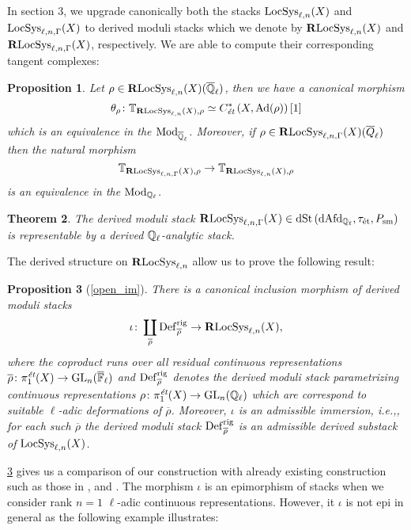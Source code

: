 \documentclass[10pt,a4paper]{amsart}
\numberwithin{equation}{subsection}
\theoremstyle{plain}
\newtheorem{theorem}{Theorem}[section]
\newtheorem{prop}[theorem]{Proposition}
\theoremstyle{definition}
\theoremstyle{remark}
\numberwithin{equation}{section}
\begin{document}
In section 3, we upgrade canonically both the stacks $\mathrm{LocSys}_{\ell, n}(X)$ and $\mathrm{LocSys}_{\ell, n, \Gamma}(X)$ to derived moduli stacks which we denote by $\mathbf R \mathrm{LocSys}_{\ell, n}(X)$ and $\mathbf R \mathrm{LocSys}_{\ell, n, \Gamma}(X)$, respectively. We are able to compute their corresponding tangent complexes:

\begin{prop}
Let $\rho \in \mathbf R \mathrm{LocSys}_{\ell, n}(X)(\overline{\mathbb{Q}}_\ell)$, then we have a canonical morphism
	\[
		\theta_\rho \colon \mathbb T_{\mathbf R \mathrm{LocSys}_{\ell, n}(X), \rho} \simeq C^*_{\emph{\text{\'et}}} \left(X, \mathrm{Ad}(\rho) \right) [1]
	\]
which is an equivalence in the \infcat $\mathrm{Mod}_{\overline{\mathbb{Q}}_\ell}$. Moreover, if $\rho \in \mathbf R \mathrm{LocSys}_{\ell, n, \Gamma}(X)(\overline{Q}_\ell)$ then the natural morphism 
	\[
		\mathbb T_{\mathbf R \mathrm{LocSys}_{\ell, n, \Gamma}(X), \rho} \to \mathbb T_{\mathbf R \mathrm{LocSys}_{\ell, n}(X), \rho}
	\]
is an equivalence in the \infcat $\mathrm{Mod}_{\mathbb{Q}_\ell}$.
\end{prop}


\begin{theorem} \label{thm:der}
The derived moduli stack $\mathbf R \mathrm{LocSys}_{\ell, n, \Gamma}(X) \in \mathrm{dSt} \left( \mathrm{dAfd}_{\mathbb{Q}_\ell}, \tau_{\text{\'et}}, P_{\mathrm{sm}} \right)$ is representable by a \emph{derived $\mathbb{Q}_{\ell}$-analytic stack}.
\end{theorem}

The derived structure on $\mathbf R \mathrm{LocSys}_{\ell, n}$ allow us to prove the following result:

\begin{prop}[\cref{open_im}] \label{op}
There is a canonical inclusion morphism of derived moduli stacks
	\[
		\iota \colon \coprod_{\overline{\rho}} \mathbf{\mathrm{Def}}^{\mathrm{rig}}_{\overline{\rho}} \to \mathbf R \mathrm{LocSys}_{\ell, n}(X),
	\]
where the coproduct runs over all residual continuous representations $\overline{\rho} \colon \pi_1^{\emph{\text{\'et}}}(X) \to \mathrm{GL}_n(	\overline{\mathbb{F}}_\ell	)$ and $\mathbf{\mathrm{Def}}^{\mathrm{rig}}_{\overline{\rho}}$ denotes the derived moduli stack parametrizing continuous
representations $\rho \colon \pi_1^{\emph{\text{\'et}}} (X) \to \mathrm{GL}_n(\mathbb{Q}_\ell)$ which are correspond to suitable $\ell$-adic deformations of $\overline{\rho}$. Moreover, $\iota$ is an admissible immersion, i.e.,, for each such $\overline{\rho}$ the derived moduli stack
$\mathbf{\mathrm{Def}}^{\mathrm{rig}}_{\overline{\rho}}$ is an admissible derived substack of $\mathrm{LocSys}_{\ell, n}(X)$.
\end{prop}

\cref{op} gives us a comparison of our construction with already existing construction such as those in \cite{chenevier}, \cite{mazurDG} and \cite{galatius_dg}. The morphism $\iota$ is an epimorphism of stacks when we consider rank $n=1$ $\ell$-adic continuous
representations. However, it $\iota$ is not epi in general as the following example illustrates:
\end{document}
